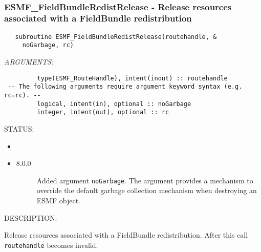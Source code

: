  
\mbox{}\hrulefill\ 
 
\subsubsection [ESMF\_FieldBundleRedistRelease] {ESMF\_FieldBundleRedistRelease - Release resources associated with a FieldBundle redistribution}


  
\begin{verbatim}   subroutine ESMF_FieldBundleRedistRelease(routehandle, &
     noGarbage, rc)\end{verbatim}{\em ARGUMENTS:}
\begin{verbatim}         type(ESMF_RouteHandle), intent(inout) :: routehandle
 -- The following arguments require argument keyword syntax (e.g. rc=rc). --
         logical, intent(in), optional :: noGarbage
         integer, intent(out), optional :: rc\end{verbatim}
{\sf STATUS:}
   \begin{itemize}
   \item{}
   \item{}
   \begin{description}
   \item[8.0.0] Added argument {\tt noGarbage}.
   The argument provides a mechanism to override the default garbage collection
   mechanism when destroying an ESMF object.
   \end{description}
   \end{itemize}
  
{\sf DESCRIPTION:\\ }


   Release resources associated with a FieldBundle redistribution. After this call
   {\tt routehandle} becomes invalid.
  
